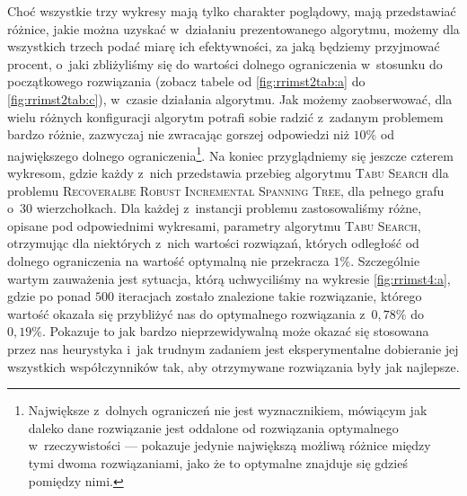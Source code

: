 Choć wszystkie trzy wykresy mają tylko charakter poglądowy, mają przedstawiać różnice, jakie można uzyskać w~działaniu prezentowanego algorytmu, możemy dla wszystkich trzech podać miarę ich efektywności, za jaką będziemy przyjmować procent, o~jaki zbliżyliśmy się do wartości dolnego ograniczenia w~stosunku do początkowego rozwiązania (zobacz tabele od \ref{fig:rrimst2tab:a} do \ref{fig:rrimst2tab:c}), w~czasie działania algorytmu. Jak możemy zaobserwować, dla wielu różnych konfiguracji algorytm potrafi sobie radzić z~zadanym problemem bardzo różnie, zazwyczaj nie zwracając gorszej odpowiedzi niż $10\%$ od największego dolnego ograniczenia\footnote{Największe z~dolnych ograniczeń nie jest wyznacznikiem, mówiącym jak daleko dane rozwiązanie jest oddalone od rozwiązania optymalnego w~rzeczywistości --- pokazuje jedynie największą możliwą różnice między tymi dwoma rozwiązaniami, jako że to optymalne znajduje się gdzieś pomiędzy nimi.}. Na koniec przyglądniemy się jeszcze czterem wykresom, gdzie każdy z~nich przedstawia przebieg algorytmu \textsc{Tabu Search} dla problemu \textsc{Recoveralbe Robust Incremental Spanning Tree}, dla pełnego grafu o~$30$ wierzchołkach. Dla każdej z~instancji problemu zastosowaliśmy różne, opisane pod odpowiednimi wykresami, parametry algorytmu \textsc{Tabu Search}, otrzymując dla niektórych z~nich wartości rozwiązań, których odległość od dolnego ograniczenia na wartość optymalną nie przekracza $1\%$. Szczególnie wartym zauważenia jest sytuacja, którą uchwyciliśmy na wykresie \ref{fig:rrimst4:a}, gdzie po ponad $500$ iteracjach zostało znalezione takie rozwiązanie, którego wartość okazała się przybliżyć nas do optymalnego rozwiązania z~$0,78\%$ do $0,19\%$. Pokazuje to jak bardzo nieprzewidywalną może okazać się stosowana przez nas heurystyka i~jak trudnym zadaniem jest eksperymentalne dobieranie jej wszystkich współczynników tak, aby otrzymywane rozwiązania były jak najlepsze.

